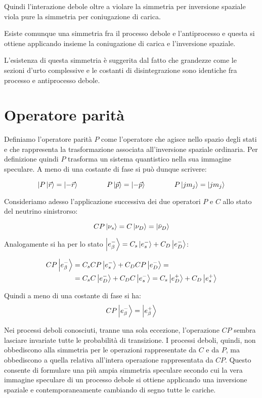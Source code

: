 Quindi l'interazione debole oltre a violare la simmetria per inversione spaziale
viola pure la simmetria per coniugazione di carica.

Esiste comunque una simmetria fra il processo debole e l'antiprocesso e questa
si ottiene applicando insieme la coniugazione di carica e l'inversione spaziale.

L'esistenza di questa simmetria è suggerita dal fatto che grandezze come le
sezioni d'urto complessive e le costanti di disintegrazione sono identiche fra
processo e antiprocesso debole. 

\chapter{Operatore parità}

Definiamo l'operatore parità $P$ come l'operatore che agisce nello spazio degli
stati e che rappresenta la trasformazione associata all'inversione spaziale
ordinaria. Per definizione quindi $P$ trasforma un sistema quantistico nella sua
immagine speculare. A meno di una costante di fase si può dunque scrivere:

\begin{equation*}
| P \Ket{\vec{r}} = \Ket{-\vec{r}} \qquad \qquad P \Ket{\vec{p}}=\Ket{-\vec{p}} 
\qquad \qquad P \Ket{ j m_j} = \Ket{j m_j}
\end{equation*}

Consideriamo adesso l'applicazione successiva dei due operatori $P$ e $C$ allo
stato del neutrino sinistrorso:

\begin{equation*}
C P \Ket{\nu_s} = C \Ket{\nu_D} = \Ket{\bar{\nu}_D}
\end{equation*}

Analogamente si ha per lo stato $\Ket{e^-_\beta} = C_s\Ket{e^-_s} + C_D
\Ket{e^-_D}$:

\begin{align*}
C P \Ket{e^-_\beta} &= C_s C P \Ket{e^-_s} + C_D C P \Ket{e^-_D} = \\
&= C_s C \Ket{e^-_D} + C_D C \Ket{e^-_s} = C_s \Ket{e^+_D} + C_D \Ket{e^+_s}
\end{align*}

Quindi a meno di una costante di fase si ha:
\begin{equation*}
  CP  \Ket{e^-_\beta} = \Ket{e^+_\beta}
\end{equation*}

Nei processi deboli conosciuti, tranne una sola eccezione, l'operazione $C P$
sembra lasciare invariate tutte le probabilità di transizione. I processi
deboli, quindi, non obbediscono alla simmetria per le operazioni rappresentate
da $C$ e da $P$, ma obbediscono a quella relativa all'intera operazione
rappresentata da $CP$. Questo consente di formulare una più ampia simmetria
speculare secondo cui la vera immagine speculare di un processo debole si
ottiene applicando una inversione spaziale e contemporaneamente cambiando di
segno tutte le cariche.

